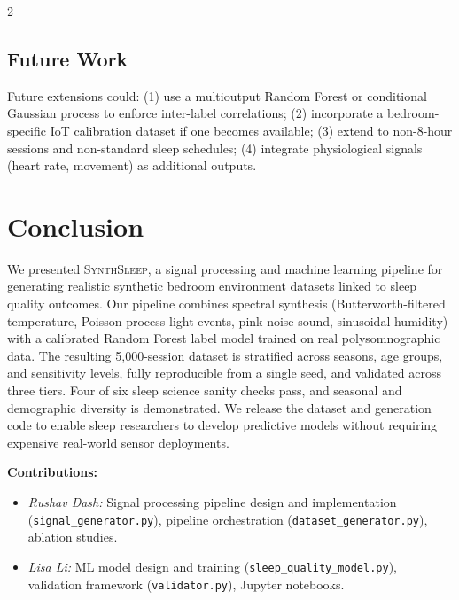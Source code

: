\documentclass[11pt,a4paper]{article}
\newcommand{\ourmethod}{\textsc{SynthSleep}}
\begin{document}
\begin{multicols}{2}
\subsection{Future Work}

Future extensions could: (1) use a multioutput Random Forest or conditional
Gaussian process to enforce inter-label correlations; (2) incorporate a bedroom-
specific IoT calibration dataset if one becomes available; (3) extend to
non-8-hour sessions and non-standard sleep schedules; (4) integrate physiological
signals (heart rate, movement) as additional outputs.

\section{Conclusion}

We presented \ourmethod{}, a signal processing and machine learning pipeline
for generating realistic synthetic bedroom environment datasets linked to sleep
quality outcomes.  Our pipeline combines spectral synthesis (Butterworth-filtered
temperature, Poisson-process light events, pink noise sound, sinusoidal humidity)
with a calibrated Random Forest label model trained on real polysomnographic data.
The resulting 5,000-session dataset is stratified across seasons, age groups,
and sensitivity levels, fully reproducible from a single seed, and validated
across three tiers.  Four of six sleep science sanity checks pass, and seasonal
and demographic diversity is demonstrated.  We release the dataset and generation
code to enable sleep researchers to develop predictive models without requiring
expensive real-world sensor deployments.

\textbf{Contributions:}
\begin{itemize}\setlength\itemsep{0pt}
  \item \textit{Rushav Dash:} Signal processing pipeline design and implementation
        (\texttt{signal\_generator.py}), pipeline orchestration
        (\texttt{dataset\_generator.py}), ablation studies.
  \item \textit{Lisa Li:} ML model design and training (\texttt{sleep\_quality\_model.py}),
        validation framework (\texttt{validator.py}), Jupyter notebooks.
\end{itemize}



\end{multicols}
\end{document}
